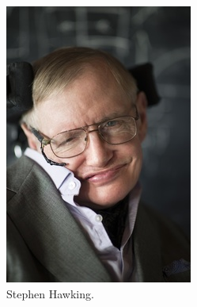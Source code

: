 \documentclass[a4paper]{amsbook}
\theoremstyle{definition}
\numberwithin{exercise}{chapter}
\numberwithin{exercise}{chapter}
\newcommand\capcite[1]{}
\begin{document}
\begin{figure}
  \centering
  \begin{subfigure}{0.4\textwidth}
    \includegraphics[width = \textwidth]{hawking}
    \caption{Stephen Hawking. \capcite{http://www.hawking.org.uk/uploads/1/2/2/1/12210141/swh-1-web.jpg?233} \label{fig:hawking}}
  \end{subfigure}\hfill%
  \begin{subfigure}{0.4\textwidth}

\end{subfigure}
\end{figure}
\end{document}
